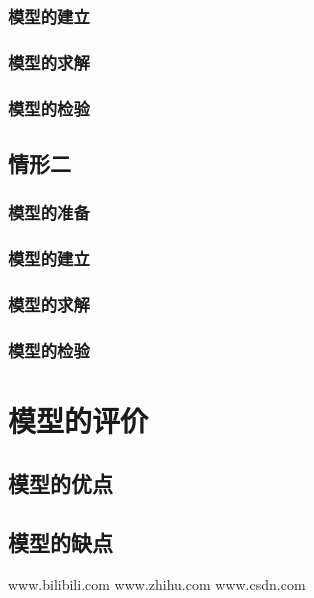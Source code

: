 \documentclass[]{article}
\begin{document}
\subsubsection{模型的建立}
\subsubsection{模型的求解}
\subsubsection{模型的检验}

\subsection{情形二}
\subsubsection{模型的准备}
\subsubsection{模型的建立}
\subsubsection{模型的求解}
\subsubsection{模型的检验}

\section{模型的评价}
\subsection{模型的优点}
\subsection{模型的缺点}

\begin{thebibliography}{99}
     www.bilibili.com
     www.zhihu.com 
     www.csdn.com
\end{thebibliography}
\end{document}
